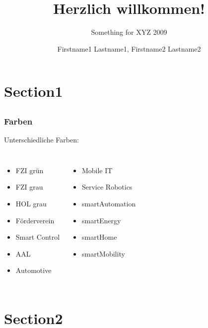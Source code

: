 \documentclass[18pt]{beamer}
\title[Short title]{Herzlich willkommen!}
\subtitle{Something for XYZ 2009}
\author{Firstname1 Lastname1, Firstname2 Lastname2}
\begin{document}

\begin{frame}
\titlepage
\end{frame}
\section{Section1}
\subsection{}
\begin{frame}
\frametitle{Farben}
	Unterschiedliche Farben:
\begin{columns}

	\begin{itemize}
		\item \textcolor{fzi-green}{FZI grün}
		\item \textcolor{fzi-gray}{FZI grau}
		\item \textcolor{fzi-gray-hol}{HOL grau}
		\item \textcolor{fzi-foerververein}{Förderverein}
		\item \textcolor{fzi-control}{Smart Control}
		\item \textcolor{fzi-aal}{AAL}
		\item \textcolor{fzi-automotive}{Automotive}
	\end{itemize}
	
	\begin{itemize}
		\item \textcolor{fzi-mobile}{Mobile IT}
		\item \textcolor{fzi-robot}{Service Robotics}
		\item \textcolor{fzi-automation}{smartAutomation}
		\item \textcolor{fzi-energy}{smartEnergy}
		\item \textcolor{fzi-home}{smartHome}
		\item \textcolor{fzi-mobility}{smartMobility}	
	\end{itemize}

	\end{columns}

\end{frame}

\section{Section2}
\end{document}
